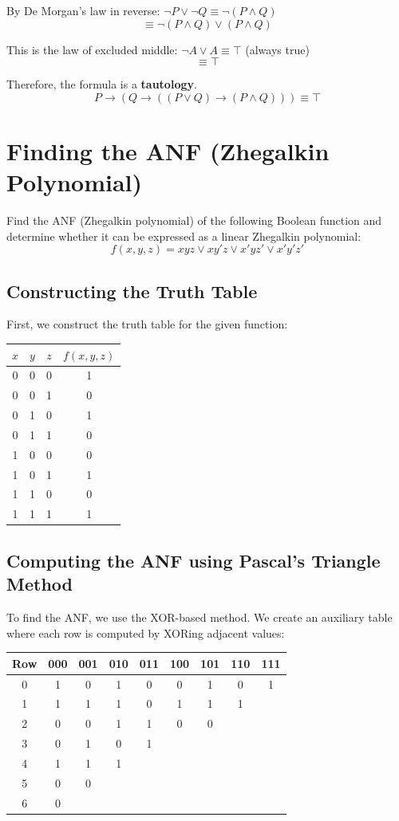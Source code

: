 \documentclass[11pt]{article}
\begin{document}
By De Morgan's law in reverse: \(\neg P \lor \neg Q \equiv \neg(P \land Q)\)
\[
\equiv \neg(P \land Q) \lor (P \land Q)
\]

This is the law of excluded middle: \(\neg A \lor A \equiv \top\) (always true)
\[
\equiv \top
\]

Therefore, the formula is a \textbf{\textbf{tautology}}.
\[
\boxed{P \to (Q \to ((P \lor Q) \to (P \land Q))) \equiv \top}
\]

\newpage
\section{Finding the ANF (Zhegalkin Polynomial)}
\label{sec:orga75f0d6}
Find the ANF (Zhegalkin polynomial) of the following Boolean function and determine whether it can be expressed as a linear Zhegalkin polynomial:
\[
f(x,y,z) = xyz \lor xy'z \lor x'yz' \lor x'y'z'
\]
\subsection{Constructing the Truth Table}
\label{sec:org9f71294}
First, we construct the truth table for the given function:

\begin{center}
\begin{tabular}{|c|c|c|c|}
\hline
$x$ & $y$ & $z$ & $f(x,y,z)$ \\
\hline
0 & 0 & 0 & 1 \\
0 & 0 & 1 & 0 \\
0 & 1 & 0 & 1 \\
0 & 1 & 1 & 0 \\
1 & 0 & 0 & 0 \\
1 & 0 & 1 & 1 \\
1 & 1 & 0 & 0 \\
1 & 1 & 1 & 1 \\
\hline
\end{tabular}
\end{center}
\subsection{Computing the ANF using Pascal's Triangle Method}
\label{sec:org17b7720}
To find the ANF, we use the XOR-based method. We create an auxiliary table where each row is computed by XORing adjacent values:

\begin{center}
\begin{tabular}{|c|c|c|c|c|c|c|c|c|}
\hline
Row & 000 & 001 & 010 & 011 & 100 & 101 & 110 & 111 \\
\hline
0 & 1 & 0 & 1 & 0 & 0 & 1 & 0 & 1 \\
1 & 1 & 1 & 1 & 0 & 1 & 1 & 1 & \\
2 & 0 & 0 & 1 & 1 & 0 & 0 & & \\
3 & 0 & 1 & 0 & 1 & & & & \\
4 & 1 & 1 & 1 & & & & & \\
5 & 0 & 0 & & & & & & \\
6 & 0 & & & & & & & \\
\hline
\end{tabular}
\end{center}
\end{document}
